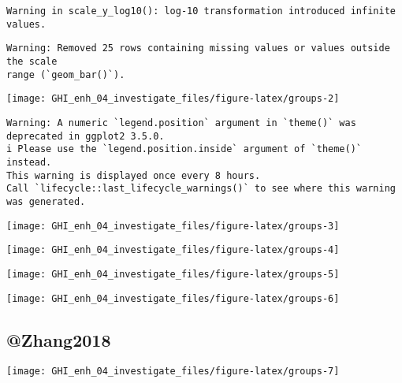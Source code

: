 \documentclass[
  10pt,
  a4paper,oneside]{article}
\begin{document}
\begin{verbatim}
Warning in scale_y_log10(): log-10 transformation introduced infinite values.
\end{verbatim}

\begin{verbatim}
Warning: Removed 25 rows containing missing values or values outside the scale
range (`geom_bar()`).
\end{verbatim}

\begin{center}\texttt{[image: GHI\_enh\_04\_investigate\_files/figure-latex/groups-2]} \end{center}

\begin{verbatim}
Warning: A numeric `legend.position` argument in `theme()` was deprecated in ggplot2 3.5.0.
i Please use the `legend.position.inside` argument of `theme()` instead.
This warning is displayed once every 8 hours.
Call `lifecycle::last_lifecycle_warnings()` to see where this warning was generated.
\end{verbatim}

\begin{center}\texttt{[image: GHI\_enh\_04\_investigate\_files/figure-latex/groups-3]} \end{center}

\begin{center}\texttt{[image: GHI\_enh\_04\_investigate\_files/figure-latex/groups-4]} \end{center}

\begin{center}\texttt{[image: GHI\_enh\_04\_investigate\_files/figure-latex/groups-5]} \end{center}

\begin{center}\texttt{[image: GHI\_enh\_04\_investigate\_files/figure-latex/groups-6]} \end{center}

\hypertarget{zhang2018}{%
\subsection{@Zhang2018}\label{zhang2018}}

\begin{center}\texttt{[image: GHI\_enh\_04\_investigate\_files/figure-latex/groups-7]} \end{center}
\end{document}
